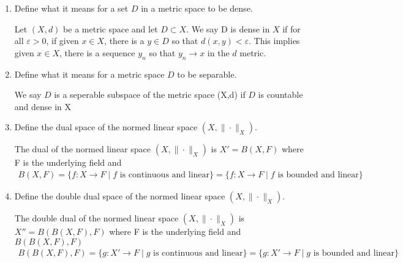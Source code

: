 \documentclass[11pt]{SelfArxOneColBMN}
\begin{document}
\begin{enumerate}
\begin{solution}
  \end{solution}
  \item Define what it means for a set $D$ in a metric space to be dense.
  \begin{solution}
    Let $(X,d)$ be a metric space and let $D \subset X$. We say D is dense in $X$ if for all $\varepsilon > 0$, if given $x \in X$, there is a $y \in D$ so that $d(x,y) < \varepsilon$. This implies given $x \in X$, there is a sequence $y_n$ so that $y_n \rightarrow x$ in the $d$ metric. 
  \end{solution}
  \item Define what it means for a metric space $D$ to be separable.
  \begin{solution}
    We say $D$ is a seperable subspace of the metric space (X,d) if $D$ is countable and dense in X
  \end{solution}
  \item Define the dual space of the normed linear space $(X,\|\cdot\|_X)$.
  \begin{solution}
    The  dual of the normed linear space $(X,\|\cdot\|_X)$ is $X' = B(X,F)$ where F is the underlying field and 
    \begin{eqnarray*}
      B(X,F) = \{f: X \rightarrow F\;|\;f\text{ is continuous and linear}\} = \{f: X \rightarrow F\;|\;f\text{ is bounded and linear}\} 
    \end{eqnarray*}
  \end{solution}
  \item Define the double dual space of the normed linear space $(X,\|\cdot\|_X)$.
  \begin{solution}
    The double dual of the normed linear space $(X,\|\cdot\|_X)$ is $X'' = B(B(X,F),F)$ where F is the underlying field and $B(B(X,F),F)$
    \begin{eqnarray*}
      B(B(X,F),F) = \{g: X' \rightarrow F\;|\;g\text{ is continuous and linear}\} = \{g: X' \rightarrow F\;|\;g\text{ is bounded and linear}\} 
    \end{eqnarray*}
  \end{solution}
\end{enumerate}
\end{document}
